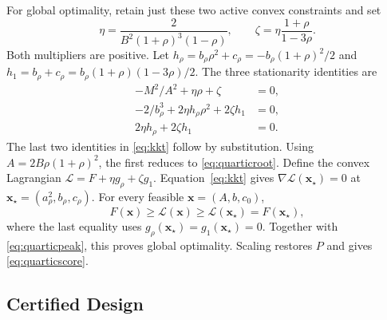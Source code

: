 \documentclass[journal,12pt,onecolumn,draftclsnofoot]{IEEEtran}
\newcommand{\enc}{\mathscr{E}}\newcommand{\dec}{\mathscr{D}}\newcommand{\R}{\mathbb R}\newcommand{\C}{\mathbb C}
\begin{document}
For global optimality, retain just these two active convex constraints and set
$$
 \eta=\frac{2}{B^2(1+\rho)^3(1-\rho)},\qquad
 \zeta=\eta\frac{1+\rho}{1-3\rho}.
$$
Both multipliers are positive. Let $h_\rho=b_\rho\rho^2+c_\rho=-b_\rho(1+\rho)^2/2$ and $h_1=b_\rho+c_\rho=b_\rho(1+\rho)(1-3\rho)/2$. The three stationarity identities are
\begin{subequations}
\begin{align}
 -M^2/A^2+\eta\rho+\zeta&=0,\\
 -2/b_\rho^3+2\eta h_\rho\rho^2+2\zeta h_1&=0,\\
 2\eta h_\rho+2\zeta h_1&=0.
\end{align}
\label{eq:kkt}
\end{subequations}
The last two identities in \eqref{eq:kkt} follow by substitution. Using $A=2B\rho(1+\rho)^2$, the first reduces to \eqref{eq:quarticroot}.
Define the convex Lagrangian $\mathcal L=F+\eta g_\rho+\zeta g_1$.
Equation~\eqref{eq:kkt} gives $\nabla\mathcal L(\boldsymbol x_\star)=0$ at $\boldsymbol x_\star=(a_\rho^2,b_\rho,c_\rho)$.
For every feasible $\boldsymbol x=(A,b,c_0)$,
$$
F(\boldsymbol x)\ge\mathcal L(\boldsymbol x)
\ge\mathcal L(\boldsymbol x_\star)=F(\boldsymbol x_\star),
$$
where the last equality uses $g_\rho(\boldsymbol x_\star)=g_1(\boldsymbol x_\star)=0$.
Together with \eqref{eq:quarticpeak}, this proves global optimality. Scaling restores $P$ and gives \eqref{eq:quarticscore}.










\subsection{Certified Design}\label{sec:certified}
\end{document}
